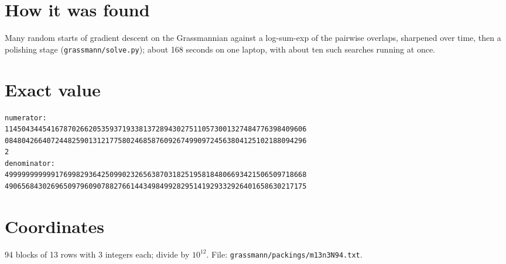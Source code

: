 \documentclass[11pt,a4paper]{article}
\begin{document}
\section{How it was found}
Many random starts of gradient descent on the Grassmannian against a log-sum-exp of the pairwise overlaps, sharpened over time, then a polishing stage (\texttt{grassmann/solve.py}); about 168 seconds on one laptop, with about ten such searches running at once.


\appendix
\section{Exact value}
{\small
\begin{verbatim}
numerator:
114504344541678702662053593719338137289430275110573001327484776398409606
084804266407244825901312177580246858760926749909724563804125102188094296
2
denominator:
499999999999176998293642509902326563870318251958184806693421506509718668
490656843026965097960907882766144349849928295141929332926401658630217175
\end{verbatim}}

\section{Coordinates}
94 blocks of 13 rows with 3 integers each; divide by $10^{12}$. File: \texttt{grassmann/packings/m13n3N94.txt}.
{\tiny
\begin{multicols}{3}
\end{multicols}}
\end{document}
